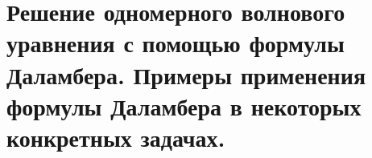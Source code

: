 \section{Решение одномерного волнового уравнения с помощью формулы Даламбера.
Примеры применения формулы Даламбера в некоторых конкретных задачах.}

\newpage
